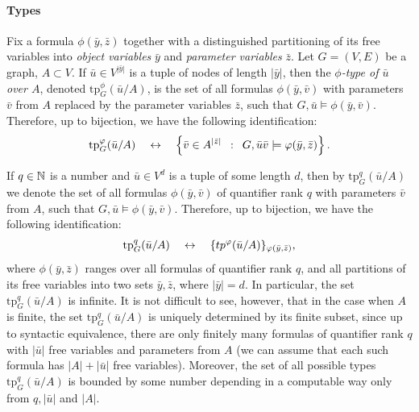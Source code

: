 \paragraph{Types}
\newcommand{\tp}{\mathrm{tp}}
Fix a formula $\phi(\bar y,\bar z)$ together with a distinguished partitioning of its free variables into 
\emph{object variables} $\bar y$ and \emph{parameter variables} $\bar z$. 
Let $G=(V,E)$ be a graph, $A\subset V$.
If $\bar u\in V^{|\bar y|}$ is a tuple of 
nodes of length $|\bar y|$, then the 
\emph{$\phi$-type of $\bar u$ over $A$},
denoted $\tp^\phi_G(\bar u/A)$,
is the set of all
formulas  $\phi(\bar y,\bar v)$ 
with parameters $\bar v$ from $A$
replaced by the parameter variables $\bar z$,
such that $G,\bar u\models \phi(\bar y,\bar v)$.
Therefore, up to  bijection, we have the following identification:
$$\tp^\phi_G(\bar u/A)\quad\leftrightarrow\quad\setof{\bar v\in  A^{|\bar z|}}{G, \bar u\bar v\models \phi(\bar y,\bar z)}.$$


If $q\in \mathbb{N}$ is a number and $\bar u\in  V^{d}$
is a tuple of some length $d$, then by $\tp^q_G(\bar u/A)$  we denote the set of all formulas $\phi(\bar y,\bar v)$
of quantifier rank $q$ with parameters $\bar v$ from $A$,
such that $G,\bar u\models \phi(\bar y,\bar v)$.
Therefore, up to  bijection, we have the following identification:
$$\tp^q_G(\bar u/A)\quad\leftrightarrow\quad\set{tp^\phi(\bar u/A)}_{\phi(\bar y,\bar z)},$$
where $\phi(\bar y,\bar z)$ ranges over all formulas of quantifier rank $q$, and all partitions of its free variables into two sets $\bar y,\bar z$,
where $|\bar y|=d$. 
In particular, the set $\tp^q_G(\bar u/A)$ is infinite.
It is not difficult to see, however, that in the case when $A$ is finite,
the set $\tp^q_G(\bar u/A)$ is uniquely determined by its finite subset, since up to syntactic equivalence, there are only finitely many formulas of quantifier rank $q$ with $|\bar u|$ free variables and  parameters from $A$
(we can assume that each such formula has $|A|+|\bar u|$ free variables).
Moreover, the set of all possible types 
$\tp^q_G(\bar u/A)$ is bounded by some number 
depending in a computable way only from 
$q,|\bar u|$ and $|A|$.

